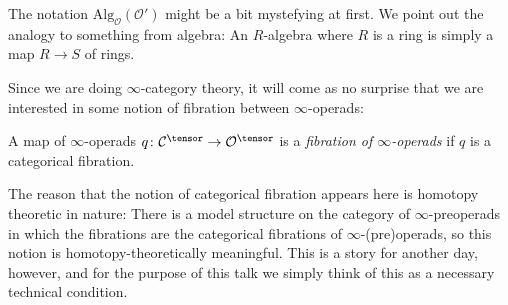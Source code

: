 \documentclass[topology]{bsteffan-notes}
\newcommand{\cC}{{\mathcal{C}}}
\newcommand{\cO}{{\mathcal{O}}}
\newcommand{\Alg}{\mathrm{Alg}}
\begin{document}
The notation $\Alg_{\cO}(\cO')$ might be a bit mystefying at first.
We point out the analogy to something from algebra:
An $R$-algebra where $R$ is a ring is simply a map $R \to S$ of rings.

Since we are doing $\infty$-category theory, it will come as no surprise that we are interested in some notion of fibration between $\infty$-operads:
\begin{definition}
	A map of $\infty$-operads $q\colon \cC^\tensor \to \cO^\tensor$ is a \emph{fibration of $\infty$-operads} if $q$ is a categorical fibration.
\end{definition}
The reason that the notion of categorical fibration appears here is homotopy theoretic in nature: There is a model structure on the category of $\infty$-preoperads in which the fibrations are the categorical fibrations of $\infty$-(pre)operads, so this notion is homotopy-theoretically meaningful. 
This is a story for another day, however, and for the purpose of this talk we simply think of this as a necessary technical condition.
\end{document}
